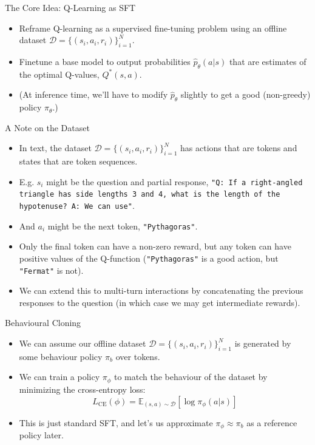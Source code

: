 \documentclass[aspectratio=169]{beamer}
\begin{document}
\begin{frame}{The Core Idea: Q-Learning as SFT}
  \begin{itemize}[<+->]
    \item Reframe Q-learning as a supervised fine-tuning problem using an offline dataset $\mathcal{D} = \{(s_i, a_i, r_i)\}_{i=1}^N$.
    \item Finetune a base model to output probabilities $\hat{p}_\theta (a | s)$ that are estimates of the optimal Q-values, $Q^*(s,a)$. 
    \item (At inference time, we'll have to modify $\hat{p}_\theta$ slightly to get a good (non-greedy) policy $\pi_\theta$.)
  \end{itemize}
\end{frame}

\begin{frame}{A Note on the Dataset}
    \begin{itemize}[<+->]
        \item In text, the dataset $\mathcal{D} = \{(s_i, a_i, r_i)\}_{i=1}^N$ has actions that are tokens and states that are token sequences.
        \item E.g. $s_i$ might be the question and partial response, \texttt{"Q: If a right-angled triangle has side lengths 3 and 4, what is the length of the hypotenuse? A: We can use"}.
        \item And $a_i$ might be the next token, \texttt{"Pythagoras"}.
        \item Only the final token can have a non-zero reward, but any token can have positive values of the Q-function (\texttt{"Pythagoras"} is a good action, but \texttt{"Fermat"} is not).
        \item We can extend this to multi-turn interactions by concatenating the previous responses to the question (in which case we may get intermediate rewards).
    \end{itemize}
\end{frame}


\begin{frame}{Behavioural Cloning}
    \begin{itemize}[<+->]
        \item We can assume our offline dataset $\mathcal{D} = \{(s_i, a_i, r_i)\}_{i=1}^N$ is generated by some behaviour policy $\pi_b$ over tokens.
        \item We can train a policy $\pi_\phi$ to match the behaviour of the dataset by minimizing the cross-entropy loss:
        $$L_{\text{CE}}(\phi) = \mathbb{E}_{(s,a) \sim \mathcal{D}} \left[ \log \pi_\phi(a | s) \right]$$
        \item This is just standard SFT, and let's us approximate $\pi_\phi \approx \pi_b$ as a reference policy later.
    \end{itemize}
\end{frame}
\end{document}
